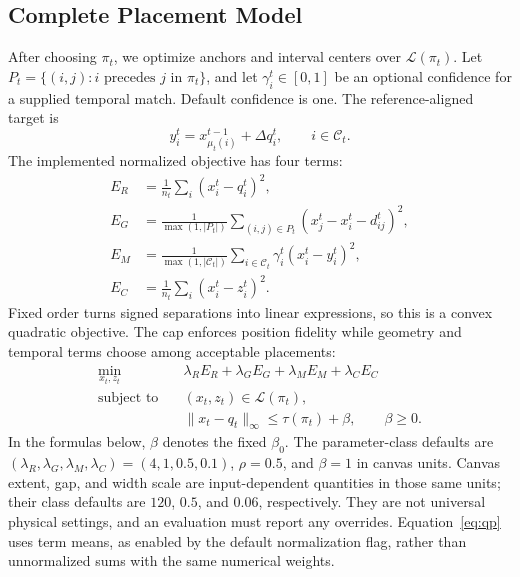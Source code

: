 \documentclass[preprint]{vgtc}   %
\begin{document}
\begin{algorithm}[htbp]
\caption{Width-Aware Refinement of One Candidate Structure}\label{alg:refine}
\end{algorithm}

\subsection{Complete Placement Model}\label{sec:placement}
After choosing $\pi_t$, we optimize anchors and interval centers over $\mathcal{L}(\pi_t)$. Let $P_t=\{(i,j):i\text{ precedes }j\text{ in }\pi_t\}$, and let $\gamma_i^t\in[0,1]$ be an optional confidence for a supplied temporal match. Default confidence is one. The reference-aligned target is
\[
 y_i^t=x_{\mu_t(i)}^{t-1}+\Delta q_i^t,\qquad i\in\mathcal{C}_t.
\]
The implemented normalized objective has four terms:
\begin{equation}\label{eq:qpterms}
\begin{aligned}
 E_R&=\frac1{n_t}\sum_i(x_i^t-q_i^t)^2,\\
 E_G&=\frac1{\max(1,|P_t|)}\sum_{(i,j)\in P_t}
                 (x_j^t-x_i^t-d_{ij}^t)^2,\\
 E_M&=\frac1{\max(1,|\mathcal{C}_t|)}\sum_{i\in\mathcal{C}_t}
                     \gamma_i^t(x_i^t-y_i^t)^2,\\
 E_C&=\frac1{n_t}\sum_i(x_i^t-z_i^t)^2.
\end{aligned}
\end{equation}
Fixed order turns signed separations into linear expressions, so this is a convex quadratic objective. The cap enforces position fidelity while geometry and temporal terms choose among acceptable placements:
\begin{equation}\label{eq:qp}
\begin{aligned}
 \min_{x_t,z_t}\quad&\lambda_R E_R+\lambda_G E_G+
                       \lambda_M E_M+\lambda_C E_C\\
 \text{subject to}\quad&(x_t,z_t)\in\mathcal{L}(\pi_t),\\
 &\|x_t-q_t\|_\infty\le\tau(\pi_t)+\beta,\qquad\beta\ge0.
\end{aligned}
\end{equation}
In the formulas below, $\beta$ denotes the fixed $\beta_0$. The parameter-class defaults are $(\lambda_R,\lambda_G,\lambda_M,\lambda_C)=(4,1,0.5,0.1)$, $\rho=0.5$, and $\beta=1$ in canvas units. Canvas extent, gap, and width scale are input-dependent quantities in those same units; their class defaults are $120$, $0.5$, and $0.06$, respectively. They are not universal physical settings, and an evaluation must report any overrides. Equation~\ref{eq:qp} uses term means, as enabled by the default normalization flag, rather than unnormalized sums with the same numerical weights.
\end{document}
